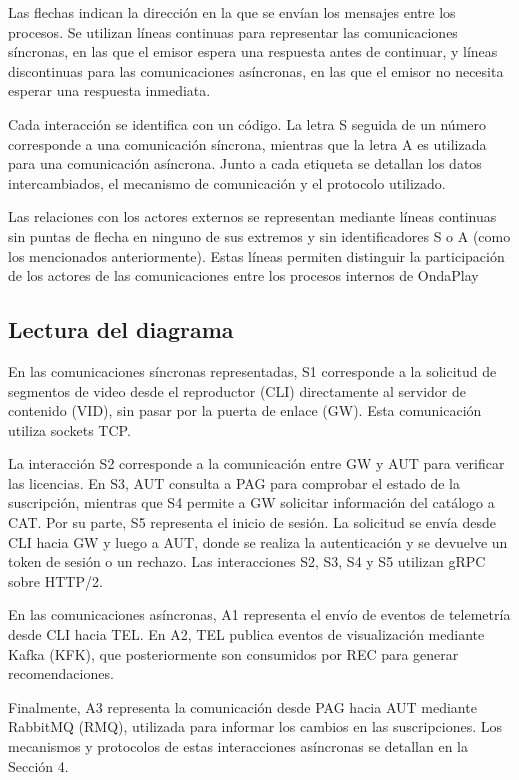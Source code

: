 Las flechas indican la dirección en la que se envían
los mensajes entre los procesos. Se utilizan líneas
continuas para representar las comunicaciones síncronas,
en las que el emisor espera una respuesta antes de
continuar, y líneas discontinuas para las comunicaciones
asíncronas, en las que el emisor no necesita esperar
una respuesta inmediata.

Cada interacción se identifica con un código. La letra
S seguida de un número corresponde a una comunicación
síncrona, mientras que la letra A es utilizada para una
comunicación asíncrona. Junto a cada etiqueta se detallan los datos intercambiados, el mecanismo de
comunicación y el protocolo utilizado.

Las relaciones con los actores externos se representan mediante líneas continuas sin puntas de flecha en ninguno de sus extremos
y sin identificadores S o A (como los mencionados anteriormente). Estas líneas permiten distinguir la participación de los actores
de las comunicaciones entre los procesos internos de OndaPlay

\subsection{Lectura del diagrama}

En las comunicaciones síncronas representadas, S1 corresponde a la solicitud de segmentos de video desde el reproductor
(CLI) directamente al servidor de contenido (VID), sin pasar por la puerta de enlace (GW). Esta comunicación utiliza 
sockets TCP.

La interacción S2 corresponde a la comunicación entre GW y AUT para verificar las licencias. En S3, AUT consulta a PAG para comprobar el estado de la suscripción, 
mientras que S4 permite a GW solicitar información del catálogo a CAT.
Por su parte, S5 representa el inicio de sesión. La solicitud se envía desde CLI hacia GW y luego a AUT, 
donde se realiza la autenticación y se devuelve un token de sesión o un rechazo. Las interacciones S2, S3, S4 y S5 utilizan gRPC sobre HTTP/2.

En las comunicaciones asíncronas, A1 representa el envío de eventos de telemetría desde CLI hacia TEL. En A2, TEL publica eventos de visualización mediante Kafka (KFK), 
que posteriormente son consumidos por REC para generar recomendaciones.

Finalmente, A3 representa la comunicación desde PAG hacia AUT mediante RabbitMQ (RMQ), utilizada para informar los cambios en las suscripciones. Los mecanismos y protocolos de estas interacciones asíncronas se detallan en la Sección 4.